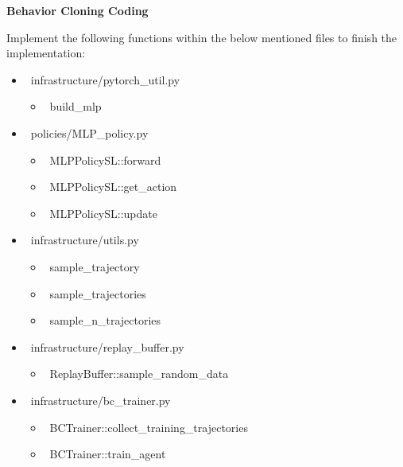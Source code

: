 \item {} \noindent \textbf{Behavior Cloning Coding} 

Implement the following functions within the below mentioned files to finish the implementation: 

\begin{itemize}
    \item ~infrastructure/pytorch_util.py~ 
    \begin{itemize}
        \item ~build_mlp~ 
    \end{itemize}
	\item ~policies/MLP_policy.py~ 
	\begin{itemize}
        \item ~MLPPolicySL::forward~
        \item ~MLPPolicySL::get_action~
        \item ~MLPPolicySL::update~
    \end{itemize}
	\item ~infrastructure/utils.py~ 
	\begin{itemize}
        \item ~sample_trajectory~
        \item ~sample_trajectories~
        \item ~sample_n_trajectories~ 
    \end{itemize}
	\item ~infrastructure/replay_buffer.py~ 
    \begin{itemize}
        \item ~ReplayBuffer::sample_random_data~ 
    \end{itemize}
    \item ~infrastructure/bc_trainer.py~ 
    \begin{itemize}
        \item ~BCTrainer::collect_training_trajectories~ 
        \item ~BCTrainer::train_agent~ 
    \end{itemize}
\end{itemize}
